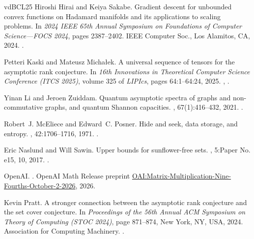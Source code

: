 \documentclass[11pt,letterpaper]{article}
\begin{document}
\begin{thebibliography}{vdBCL{\etalchar{+}}25}
Hiroshi Hirai and Keiya Sakabe.
\newblock Gradient descent for unbounded convex functions on {H}adamard
  manifolds and its applications to scaling problems.
\newblock In {\em 2024 {IEEE} 65th {A}nnual {S}ymposium on {F}oundations of
  {C}omputer {S}cience---{FOCS} 2024}, pages 2387--2402. IEEE Computer Soc.,
  Los Alamitos, CA, 2024.
\newblock \href {https://doi.org/10.1109/FOCS61266.2024.00139}
  {}.

Petteri Kaski and Mateusz Michałek.
\newblock A universal sequence of tensors for the asymptotic rank conjecture.
\newblock In {\em 16th Innovations in Theoretical Computer Science Conference
  (ITCS 2025)}, volume 325 of {\em LIPIcs}, pages 64:1--64:24, 2025.
\newblock \href {https://arxiv.org/abs/2404.06427} {},
  \href {https://doi.org/10.4230/LIPIcs.ITCS.2025.64}
  {}.

Yinan Li and Jeroen Zuiddam.
\newblock Quantum asymptotic spectra of graphs and non-commutative graphs, and
  quantum {S}hannon capacities.
, 67(1):416--432, 2021.
\newblock \href {https://doi.org/10.1109/TIT.2020.3032686}
  {}.

Robert~J. McEliece and Edward~C. Posner.
\newblock Hide and seek, data storage, and entropy.
, 42:1706--1716, 1971.
\newblock \href {https://doi.org/10.1214/aoms/1177693169}
  {}.

Eric Naslund and Will Sawin.
\newblock Upper bounds for sunflower-free sets.
, 5:Paper No. e15, 10, 2017.
\newblock \href {https://doi.org/10.1017/fms.2017.12}
  {}.

{OpenAI}.
.
\newblock OpenAI Math Release preprint
  \href{https://github.com/openai/math/blob/main/preprints/Matrix-Multiplication-Nine-Fourths-October-2-2026/paper.pdf}{OAI:Matrix-Multiplication-Nine-Fourths-October-2-2026},
  2026.

Kevin Pratt.
\newblock A stronger connection between the asymptotic rank conjecture and the
  set cover conjecture.
\newblock In {\em Proceedings of the 56th Annual ACM Symposium on Theory of
  Computing (STOC 2024)}, page 871–874, New York, NY, USA, 2024. Association
  for Computing Machinery.
\newblock \href {https://doi.org/10.1145/3618260.3649620}
  {}.


\end{thebibliography}
\end{document}

